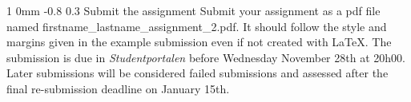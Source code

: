 \documentclass[11pt]{article}
\makeatletter
\newcommand{\newsec}[1]{\section{#1}\noindent}
\renewcommand{\section}{\@startsection
{section}%
{1}%
{0mm}%
{-0.8\baselineskip}%
{0.3\baselineskip}%
{\bfseries\large}}%
\makeatother
\begin{document}
\section{Submit the assignment}
\noindent
Submit your assignment as a pdf file named
firstname\_lastname\_assignment\_2.pdf. It should follow the style and
margins given in the example submission even if not created with
LaTeX. The submission is due in \emph{Studentportalen} before
Wednesday November 28th at 20h00. Later submissions will be considered
failed submissions and assessed after the final re-submission deadline
on January 15th.%



\end{document}
